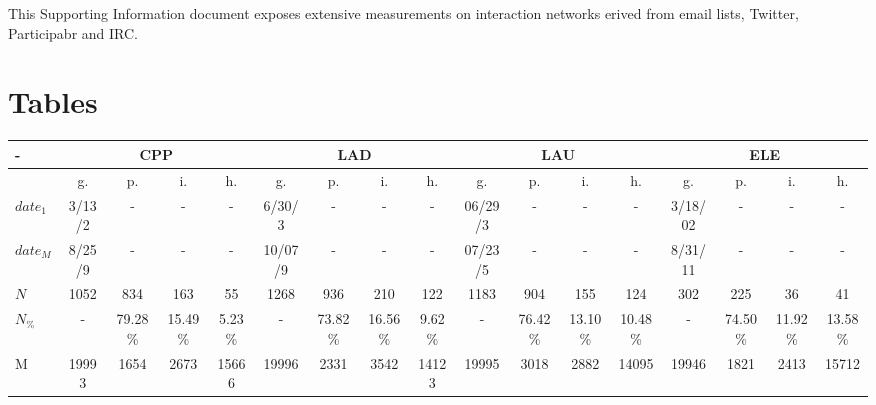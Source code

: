 \documentclass[%
 aip,
 jmp,%
 amsmath,amssymb,
 reprint,%
 floatfix,
]{revtex4-1}
\begin{document}

This Supporting Information document exposes
extensive measurements on interaction networks
erived from email lists, Twitter, Participabr and IRC.

\section{Tables}

\begin{table}
\footnotesize
  \centering
\setlength{\tabcolsep}{.056667em}
  \begin{tabular}{|l|| c|c|c|c||  c|c|c|c||   c|c|c|c||   c|c|c|c|}\hline
-\-  & \multicolumn{4}{c|}{CPP} & \multicolumn{4}{c|}{LAD} & \multicolumn{4}{c|}{LAU} & \multicolumn{4}{c|}{ELE} \\ \hline
 & g. & p. & i. & h. &     g. & p. & i. & h. &    g. & p. & i. & h. &    g. & p. & i. & h. \\\hline
$date_1$                     & 3/13/2 &  - &  - &  - &  6/30/3 &  - &  - &  - & 06/29/3 &  - &  - &  - & 3/18/02 &  - &  - &  - \\
$date_M$                     & 8/25/9 &  - &  - &  - & 10/07/9 &  - &  - &  - & 07/23/5 &  - &  - &  - & 8/31/11 &  - &  - &  -    \\\hline
$N$  & 1052 & 834 & 163 & 55 & 1268 & 936 & 210 & 122 & 1183 & 904 & 155 & 124 & 302 & 225 & 36 & 41 \\
$N_{\%}$  & - & 79.28\% & 15.49\% & 5.23\% & - & 73.82\% & 16.56\% & 9.62\% & - & 76.42\% & 13.10\% & 10.48\% & - & 74.50\% & 11.92\% & 13.58\% \\\hline
M  & 19993 & 1654 & 2673 & 15666 & 19996 & 2331 & 3542 & 14123 & 19995 & 3018 & 2882 & 14095 & 19946 & 1821 & 2413 & 15712 \\

\end{tabular}
\end{table}
\end{document}
